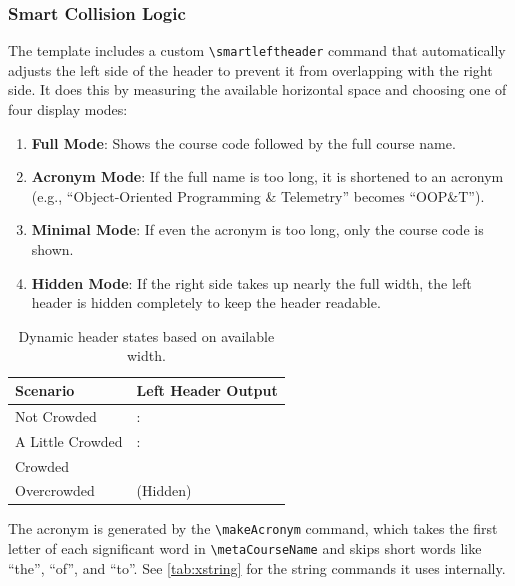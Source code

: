 \subsubsection{Smart Collision Logic}
The template includes a custom \texttt{\textbackslash smartleftheader} command that automatically adjusts the left side of the header to prevent it from overlapping with the right side. It does this by measuring the available horizontal space and choosing one of four display modes:

\begin{enumerate}[noitemsep]
	\item \textbf{Full Mode}: Shows the course code followed by the full course name.
	\item \textbf{Acronym Mode}: If the full name is too long, it is shortened to an acronym (e.g., ``Object-Oriented Programming \& Telemetry'' becomes ``OOP\&T'').
	\item \textbf{Minimal Mode}: If even the acronym is too long, only the course code is shown.
	\item \textbf{Hidden Mode}: If the right side takes up nearly the full width, the left header is hidden completely to keep the header readable.
\end{enumerate}

\begin{table}[H]
	\centering
	\caption{Dynamic header states based on available width.}
	\label{tab:header_logic}
	\begin{tabularx}{\linewidth}{@{}lX@{}}
		\toprule
		Scenario & Left Header Output \\
		\midrule
		Not Crowded   & \metaCourseCode: \metaCourseName \\
		A Little Crowded & \metaCourseCode: \makeAcronym{\metaCourseName} \\
		Crowded       & \metaCourseCode \\
		Overcrowded   & (Hidden) \\
		\bottomrule
	\end{tabularx}
\end{table}

The acronym is generated by the \texttt{\textbackslash makeAcronym} command, which takes the first letter of each significant word in \texttt{\textbackslash metaCourseName} and skips short words like ``the'', ``of'', and ``to''. See \cref{tab:xstring} for the string commands it uses internally.

